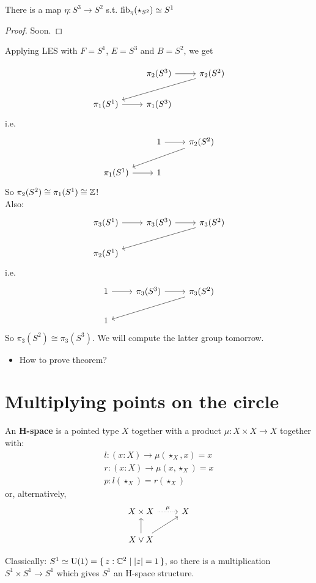 \documentclass[10pt,oneside,leqno,openright]{memoir}
\begin{document}
\begin{theorem}
  There is a map $\eta : S^3 \to S^2$ s.t. $\operatorname{fib}_\eta(\star_{S^2}) \simeq S^1$
\end{theorem}
\begin{proof}
  Soon.
\end{proof}
Applying LES with $F= S^1$, $E = S^3$ and $B=S^2$, we get

\[\begin{tikzcd}[ampersand replacement=\&]
	\& {\pi_2(S^3)} \& {\pi_2(S^2)} \\
	{\pi_1(S^1)} \& {\pi_1(S^3)}
	\arrow[from=1-2, to=1-3]
	\arrow[from=1-3, to=2-1]
	\arrow[from=2-1, to=2-2]
\end{tikzcd}\]
i.e.
\[\begin{tikzcd}[ampersand replacement=\&]
	\& 1 \& {\pi_2(S^2)} \\
	{\pi_1(S^1)} \& 1
	\arrow[from=1-2, to=1-3]
	\arrow[from=1-3, to=2-1]
	\arrow[from=2-1, to=2-2]
\end{tikzcd}\]
So $\pi_2(S^2) \cong \pi_1(S^1) \cong \mathbb{Z}$!\\
Also:
\[\begin{tikzcd}[ampersand replacement=\&]
	{\pi_3(S^1)} \& {\pi_3(S^3)} \& {\pi_3(S^2)} \\
	{\pi_2(S^1)}
	\arrow[from=1-1, to=1-2]
	\arrow[from=1-2, to=1-3]
	\arrow[from=1-3, to=2-1]
\end{tikzcd}\]
i.e.\
\[\begin{tikzcd}[ampersand replacement=\&]
	1 \& {\pi_3(S^3)} \& {\pi_3(S^2)} \\
	1
	\arrow[from=1-1, to=1-2]
	\arrow[from=1-2, to=1-3]
	\arrow[from=1-3, to=2-1]
\end{tikzcd}\]
So $\pi_3(S^2) \cong \pi_3(S^3)$. We will compute the latter group tomorrow.\\

\begin{itemize}
  \item How to prove theorem?
\end{itemize}
\section*{Multiplying points on the circle}
\begin{definition}
  An \textbf{H-space} is a pointed type $X$ together with a product $\mu:X \times X \to X$ together with:
  \begin{align*}
    l : (x :X)\to \mu(\star_X,x) = x\\
    r : (x :X)\to \mu(x,\star_X) = x\\
    p : l(\star_X) = r(\star_X)
  \end{align*}
  or, alternatively,
\[\begin{tikzcd}[ampersand replacement=\&]
	{X\times X} \& X \\
	{X\vee X}
	\arrow["\mu", dotted, from=1-1, to=1-2]
	\arrow[from=2-1, to=1-1]
	\arrow[from=2-1, to=1-2]
\end{tikzcd}\]
\end{definition}
Classically: $S^1 \simeq \mathrm{U(1)} = \{\,z:\mathbb{C}^2 \mid \lvert z\rvert=1\,\}$, so there is a multiplication $S^1 \times S^1 \to S^1$ which gives $S^1$ an H-space structure.
\end{document}
